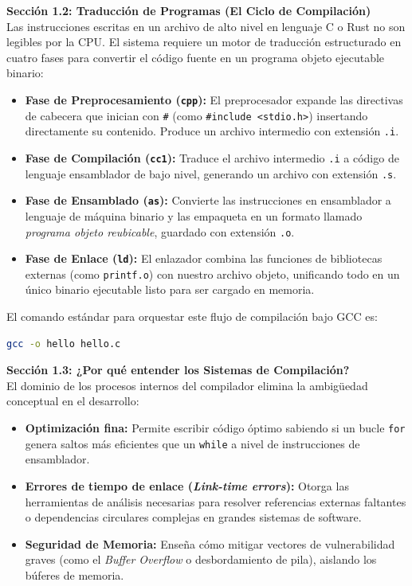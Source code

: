 \documentclass[11pt, a4paper]{article}
\begin{document}
\noindent\textbf{Sección 1.2: Traducción de Programas (El Ciclo de Compilación)}\\[0.5em]
Las instrucciones escritas en un archivo de alto nivel en lenguaje C o Rust no son legibles por la CPU. El sistema requiere un motor de traducción estructurado en cuatro fases para convertir el código fuente en un programa objeto ejecutable binario:
\begin{itemize}
  \item \textbf{Fase de Preprocesamiento (\texttt{cpp}):} El preprocesador expande las directivas de cabecera que inician con \texttt{\#} (como \texttt{\#include <stdio.h>}) insertando directamente su contenido. Produce un archivo intermedio con extensión \texttt{.i}.
  \item \textbf{Fase de Compilación (\texttt{cc1}):} Traduce el archivo intermedio \texttt{.i} a código de lenguaje ensamblador de bajo nivel, generando un archivo con extensión \texttt{.s}.
  \item \textbf{Fase de Ensamblado (\texttt{as}):} Convierte las instrucciones en ensamblador a lenguaje de máquina binario y las empaqueta en un formato llamado \textit{programa objeto reubicable}, guardado con extensión \texttt{.o}.
  \item \textbf{Fase de Enlace (\texttt{ld}):} El enlazador combina las funciones de bibliotecas externas (como \texttt{printf.o}) con nuestro archivo objeto, unificando todo en un único binario ejecutable listo para ser cargado en memoria.
\end{itemize}
El comando estándar para orquestar este flujo de compilación bajo GCC es:
\begin{lstlisting}[language=bash]
gcc -o hello hello.c
\end{lstlisting}

\noindent\textbf{Sección 1.3: ¿Por qué entender los Sistemas de Compilación?}\\[0.5em]
El dominio de los procesos internos del compilador elimina la ambigüedad conceptual en el desarrollo:
\begin{itemize}
  \item \textbf{Optimización fina:} Permite escribir código óptimo sabiendo si un bucle \texttt{for} genera saltos más eficientes que un \texttt{while} a nivel de instrucciones de ensamblador.
  \item \textbf{Errores de tiempo de enlace (\textit{Link-time errors}):} Otorga las herramientas de análisis necesarias para resolver referencias externas faltantes o dependencias circulares complejas en grandes sistemas de software.
  \item \textbf{Seguridad de Memoria:} Enseña cómo mitigar vectores de vulnerabilidad graves (como el \textit{Buffer Overflow} o desbordamiento de pila), aislando los búferes de memoria.
\end{itemize}
\end{document}
